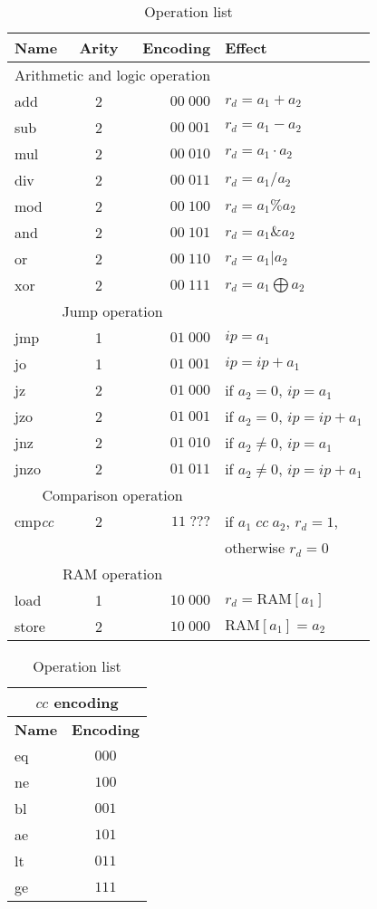 \documentclass{scrartcl}
\begin{document}
\begin{table}
  \caption{Operation list}

  \begin{tabular}{lcrl}
    \toprule
    \textbf{Name} & \textbf{Arity} & \textbf{Encoding} & \textbf{Effect}\\
    \midrule
    \midrule
    \multicolumn{3}{c}{Arithmetic and logic operation}\\
    \midrule
    add & 2 & \(00\;000\) & \(r_d=a_1+a_2\)\\
    sub & 2 & \(00\;001\) & \(r_d=a_1-a_2\)\\
    mul & 2 & \(00\;010\) & \(r_d=a_1\cdot a_2\)\\
    div & 2 & \(00\;011\) & \(r_d=a_1/a_2\)\\
    mod & 2 & \(00\;100\) & \(r_d=a_1\% a_2\)\\
    and & 2 & \(00\;101\) & \(r_d=a_1 \& a_2\)\\
    or & 2 & \(00\;110\) & \(r_d=a_1 | a_2\)\\
    xor & 2 & \(00\;111\) & \(r_d=a_1\bigoplus a_2\)\\
    \midrule
    \multicolumn{3}{c}{Jump operation}\\
    \midrule
    jmp & 1 & \(01\;000\) & \(ip=a_1\)\\
    jo & 1 & \(01\;001\) & \(ip=ip+a_1\)\\
    jz & 2 & \(01\;000\) & if \(a_2=0\), \(ip=a_1\)\\
    jzo & 2 & \(01\;001\) & if \(a_2=0\), \(ip=ip+a_1\)\\
    jnz & 2 & \(01\;010\) & if \(a_2\neq0\), \(ip=a_1\)\\
    jnzo & 2 & \(01\;011\) & if \(a_2\neq0\), \(ip=ip+a_1\)\\
    \midrule
    \multicolumn{3}{c}{Comparison operation}\\
    \midrule
    cmp\textit{cc} & 2 & \(11\;???\) & if \(a_1\;cc\;a_2\), \(r_d=1\),\\
                  &  &  & otherwise \(r_d=0\)\\
    \midrule
    \multicolumn{3}{c}{RAM operation}\\
    \midrule
    load & 1 & \(10\;000\) & \(r_d=\mathrm{RAM}[a_1]\)\\
    store & 2 & \(10\;000\) & \(\mathrm{RAM}[a_1]=a_2\)\\
    \bottomrule
  \end{tabular}
  \quad
  \begin{tabular}{lc}
    \multicolumn{2}{c}{\(cc\) encoding}\\
    \toprule
    \textbf{Name} & \textbf{Encoding}\\
    \midrule
    eq & \(000\)\\
    ne & \(100\)\\
    bl & \(001\)\\
    ae & \(101\)\\
    lt & \(011\)\\
    ge & \(111\)\\
    \bottomrule
  \end{tabular}

\end{table}
\end{document}
